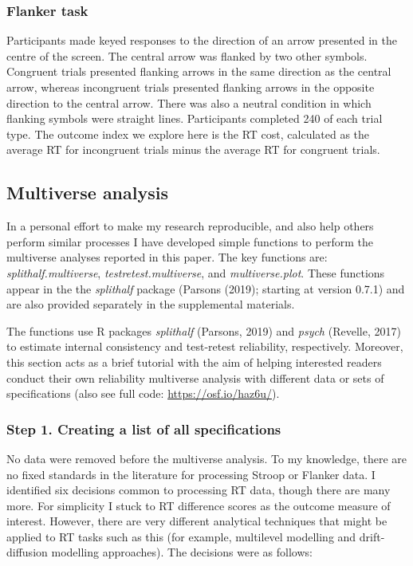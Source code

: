 \documentclass[
  english,
  man,floatsintext]{apa6}
\begin{document}
\hypertarget{flanker-task}{%
\subsubsection{Flanker task}\label{flanker-task}}

Participants made keyed responses to the direction of an arrow presented in the centre of the screen. The central arrow was flanked by two other symbols. Congruent trials presented flanking arrows in the same direction as the central arrow, whereas incongruent trials presented flanking arrows in the opposite direction to the central arrow. There was also a neutral condition in which flanking symbols were straight lines. Participants completed 240 of each trial type. The outcome index we explore here is the RT cost, calculated as the average RT for incongruent trials minus the average RT for congruent trials.

\hypertarget{multiverse-analysis}{%
\subsection{Multiverse analysis}\label{multiverse-analysis}}

In a personal effort to make my research reproducible, and also help others perform similar processes I have developed simple functions to perform the multiverse analyses reported in this paper. The key functions are: \emph{splithalf.multiverse}, \emph{testretest.multiverse}, and \emph{multiverse.plot}. These functions appear in the the \emph{splithalf} package (Parsons (2019); starting at version 0.7.1) and are also provided separately in the supplemental materials.

The functions use R packages \emph{splithalf} (Parsons, 2019) and \emph{psych} (Revelle, 2017) to estimate internal consistency and test-retest reliability, respectively. Moreover, this section acts as a brief tutorial with the aim of helping interested readers conduct their own reliability multiverse analysis with different data or sets of specifications (also see full code: \url{https://osf.io/haz6u/}).

\hypertarget{step-1.-creating-a-list-of-all-specifications}{%
\subsubsection{Step 1. Creating a list of all specifications}\label{step-1.-creating-a-list-of-all-specifications}}

No data were removed before the multiverse analysis. To my knowledge, there are no fixed standards in the literature for processing Stroop or Flanker data. I identified six decisions common to processing RT data, though there are many more. For simplicity I stuck to RT difference scores as the outcome measure of interest. However, there are very different analytical techniques that might be applied to RT tasks such as this (for example, multilevel modelling and drift-diffusion modelling approaches). The decisions were as follows:
\end{document}
